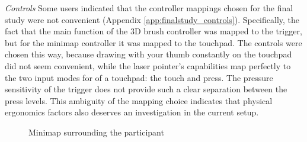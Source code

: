 \textit{Controls} Some users indicated that the controller mappings chosen for the final study were not convenient (Appendix \ref{app:finalstudy_controls}). Specifically, the fact that the main function of the 3D brush controller was mapped to the trigger, but for the minimap controller it was mapped to the touchpad. The controls were chosen this way, because drawing with your thumb constantly on the touchpad did not seem convenient, while the laser pointer's capabilities map perfectly to the two input modes for of a touchpad: the touch and press. The pressure sensitivity of the trigger does not provide such a clear separation between the press levels. This ambiguity of the mapping choice indicates that physical ergonomics factors also deserves an investigation in the current setup.

\begin{figure}[b]
	\centering
	\par
	\caption{Minimap surrounding the participant}
	\label{fig:finalstudyminimaparound}
\end{figure}